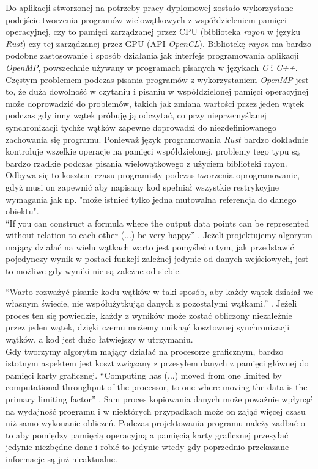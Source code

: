 \documentclass[12pt, letterpaper]{report}
\begin{document}
    Do aplikacji stworzonej na potrzeby pracy dyplomowej zostało wykorzystane podejście 
    tworzenia programów wielowątkowych z współdzieleniem pamięci operacyjnej, 
    czy to pamięci zarządzanej przez CPU (biblioteka \emph{rayon} w języku \emph{Rust}) 
    czy tej zarządzanej przez GPU (API \emph{OpenCL}).
    Bibliotekę \emph{rayon} ma bardzo podobne zastosowanie 
    i sposób działania jak interfejs programowania aplikacji 
    \emph{OpenMP}, powszechnie używany w programach pisanych w językach \emph{C} i \emph{C++}.
    Częstym problemem podczas pisania programów z wykorzystaniem \emph{OpenMP} jest to, że duża 
    dowolność w czytaniu i pisaniu w 
    współdzielonej pamięci operacyjnej może doprowadzić do problemów, takich jak
    zmiana wartości przez jeden wątek podczas gdy inny wątek próbuję ją odczytać, co 
    przy nieprzemyślanej synchronizacji tychże wątków zapewne doprowadzi do niezdefiniowanego
    zachowania się programu.
    Ponieważ język programowania \emph{Rust} bardzo dokładnie kontroluje wszelkie operacje na pamięci 
    współdzielonej, problemy tego typu są bardzo rzadkie podczas pisania wielowątkowego z
    użyciem biblioteki rayon. Odbywa się to kosztem czasu programisty podczas tworzenia 
    oprogramowanie, gdyż musi on zapewnić aby napisany kod spełniał wszystkie restrykcyjne 
    wymagania jak np. "może istnieć tylko jedna mutowalna referencja do danego obiektu". \\

    ``If you can construct a formula where the output data points can be 
    represented without relation to each other (...) be very happy'' \cite{cuda}.
    Jeżeli projektujemy algorytm mający działać na wielu wątkach warto jest pomyśleć o tym, jak
    przedstawić pojedynczy wynik w postaci funkcji zależnej jedynie od danych wejściowych, jest to 
    możliwe gdy wyniki nie są zależne od siebie. 
    
    ``Warto rozważyć pisanie kodu wątków w taki sposób, aby każdy wątek działał we 
    własnym świecie, nie współużytkując danych z pozostałymi wątkami.'' \cite{cleancode}.
    Jeżeli proces ten się powiedzie, każdy z wyników może zostać obliczony 
    niezależnie przez jeden wątek, dzięki czemu możemy uniknąć kosztownej 
    synchronizacji wątków, a kod jest dużo łatwiejszy w utrzymaniu. \\
    
    Gdy tworzymy algorytm mający działać na procesorze graficznym, bardzo istotnym aspektem jest 
    koszt związany z przesyłem danych z pamięci głównej do pamięci karty graficznej. 
    ``Computing has (...) moved from one limited by computational throughput of the 
    processor, to one where moving the data is the primary limiting factor'' \cite{cuda}.
    Sam proces kopiowania danych może poważnie wpłynąć na wydajność programu i w 
    niektórych przypadkach może on zająć więcej czasu niż samo wykonanie obliczeń.
    Podczas projektowania programu należy zadbać o to aby pomiędzy pamięcią operacyjną a 
    pamięcią karty graficznej przesyłać jedynie niezbędne dane i robić to 
    jedynie wtedy gdy poprzednio przekazane informacje są już nieaktualne.
\end{document}
